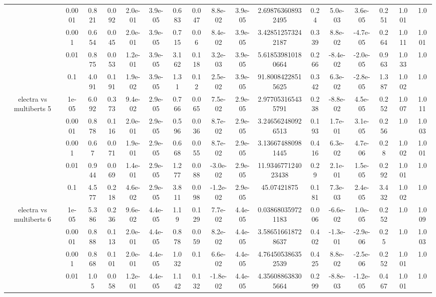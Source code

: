 \begin{tabular}{|c|c|c|c|c|c|c|c|c|c|c|c|c|c|c|c|c|}
 & 0.0001 & 0.821 & 0.092 & 2.0e-01 & 3.9e-05 & 0.683 & 0.047 & 8.8e-02 & 3.9e-05 & 2.698763608932495 & 0.24 & 5.0e-03 & 3.6e-05 & 0.251 & 1.001 & 1.0 \\
 & 0.001 & 0.654 & 0.045 & 2.0e-01 & 3.9e-05 & 0.715 & 0.06 & 8.4e-02 & 3.9e-05 & 3.428512573242187 & 0.339 & 8.8e-02 & -4.7e-05 & 0.264 & 1.011 & 1.001 \\
 & 0.01 & 0.875 & 0.053 & 1.2e-01 & 3.9e-05 & 3.162 & 0.118 & 3.2e-03 & 3.9e-05 & 5.618539810180664 & 0.266 & -8.4e-02 & -2.0e-05 & 0.963 & 1.033 & 1.0 \\
 & 0.1 & 4.091 & 0.191 & 1.9e-02 & 3.9e-05 & 1.31 & 0.12 & 2.5e-02 & 3.9e-05 & 91.80084228515625 & 0.342 & 6.3e-02 & -2.8e-05 & 1.387 & 1.002 & 1.0 \\
\hline
\multirow{5}{*}{electra  vs multiberts 5} & 1e-05 & 6.092 & 0.373 & 9.4e-02 & 2.9e-05 & 0.766 & 0.065 & 7.5e-02 & 2.9e-05 & 2.977053165435791 & 0.238 & -8.8e-02 & 4.5e-05 & 0.252 & 1.007 & 1.011 \\
 & 0.0001 & 0.878 & 0.116 & 2.0e-01 & 2.9e-05 & 0.596 & 0.036 & 8.7e-02 & 2.9e-05 & 3.246562480926513 & 0.193 & 1.7e-01 & 3.1e-05 & 0.256 & 1.0 & 1.003 \\
 & 0.001 & 0.67 & 0.071 & 1.9e-01 & 2.9e-05 & 0.668 & 0.055 & 8.7e-02 & 2.9e-05 & 3.136674880981445 & 0.416 & 6.3e-02 & 4.7e-06 & 0.28 & 1.002 & 1.001 \\
 & 0.01 & 0.944 & 0.069 & 1.4e-01 & 2.9e-05 & 1.277 & 0.088 & -3.0e-02 & 2.9e-05 & 11.934677124023438 & 0.29 & 2.1e-01 & 1.5e-05 & 0.292 & 1.001 & 1.0 \\
 & 0.1 & 4.577 & 0.218 & 4.6e-02 & 2.9e-05 & 3.811 & 0.098 & -1.2e-02 & 2.9e-05 & 45.07421875 & 0.181 & 7.3e-03 & 2.4e-05 & 3.432 & 1.002 & 1.0 \\
\hline
\multirow{5}{*}{electra  vs multiberts 6} & 1e-05 & 5.386 & 0.236 & 9.6e-02 & 4.4e-05 & 1.19 & 0.129 & 7.7e-02 & 4.4e-05 & 0.038680359721183 & 0.006 & -6.6e-02 & 1.0e-05 & 0.252 & 1.0 & 1.009 \\
 & 0.0001 & 0.888 & 0.113 & 2.0e-01 & 4.4e-05 & 0.878 & 0.059 & 8.2e-02 & 4.4e-05 & 3.586516618728637 & 0.402 & -1.3e-01 & -2.9e-06 & 0.25 & 1.0 & 1.003 \\
 & 0.001 & 0.868 & 0.101 & 2.0e-01 & 4.4e-05 & 1.032 & 0.1 & 6.6e-02 & 4.4e-05 & 4.764505386352539 & 0.425 & 8.8e-02 & -2.5e-06 & 0.252 & 1.001 & 1.0 \\
 & 0.01 & 1.05 & 0.058 & 1.2e-01 & 4.4e-05 & 1.142 & 0.132 & -1.8e-02 & 4.4e-05 & 4.356088638305664 & 0.299 & -8.8e-03 & -1.2e-05 & 0.467 & 1.001 & 1.0 \\

\end{tabular}
